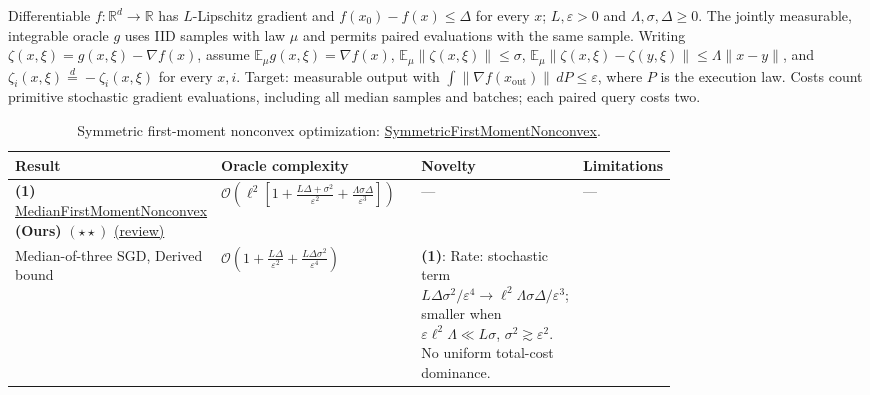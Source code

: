 \begin{table}[tp]
\centering
\caption{Symmetric first-moment nonconvex optimization: \href{https://github.com/k3nfalt/longtails/blob/main/LongTails/Setups/SymmetricFirstMomentNonconvex.lean}{Symmetric\allowbreak{}First\allowbreak{}Moment\allowbreak{}Nonconvex}.}\label{tab:SymmetricFirstMomentNonconvex}
\parbox{\linewidth}{\footnotesize Differentiable $f:\mathbb{R}^d\to\mathbb{R}$ has $L$-Lipschitz gradient and $f(x_0)-f(x)\le\Delta$ for every $x$; $L,\varepsilon>0$ and $\Lambda,\sigma,\Delta\ge0$. The jointly measurable, integrable oracle $g$ uses IID samples with law $\mu$ and permits paired evaluations with the same sample. Writing $\zeta(x,\xi)=g(x,\xi)-\nabla f(x)$, assume $\mathbb{E}_{\mu}g(x,\xi)=\nabla f(x)$, $\mathbb{E}_{\mu}\|\zeta(x,\xi)\|\le\sigma$, $\mathbb{E}_{\mu}\|\zeta(x,\xi)-\zeta(y,\xi)\|\le\Lambda\|x-y\|$, and $\zeta_i(x,\xi)\overset{d}{=}-\zeta_i(x,\xi)$ for every $x,i$. Target: measurable output with $\int\|\nabla f(x_{\mathrm{out}})\|\,dP\le\varepsilon$, where $P$ is the execution law. Costs count primitive stochastic gradient evaluations, including all median samples and batches; each paired query costs two.}\par\smallskip
\begin{threeparttable}
\footnotesize
\setlength{\tabcolsep}{4pt}\renewcommand{\arraystretch}{1.25}
\begin{tabularx}{\linewidth}{@{}>{\raggedright\arraybackslash}p{0.20\linewidth}>{\raggedright\arraybackslash}p{0.32\linewidth}>{\raggedright\arraybackslash}p{0.25\linewidth}>{\raggedright\arraybackslash}X@{}}
\toprule
\textbf{Result} & \textbf{Oracle complexity} & \textbf{Novelty} & \textbf{Limitations} \\
\midrule
\textbf{(1)} \href{https://github.com/k3nfalt/longtails/blob/main/LongTails/Theorems/MedianFirstMomentNonconvex.lean}{Median\allowbreak{}First\allowbreak{}Moment\allowbreak{}Nonconvex} \textbf{(Ours)} $(\star\star)$ \href{https://github.com/k3nfalt/longtails/blob/main/scripts/reviews/MedianFirstMomentNonconvex.md}{(review)}
& $\mathcal{O}\!\left(\ell^2\left[1+\frac{L\Delta+\sigma^2}{\varepsilon^2}+\frac{\Lambda\sigma\Delta}{\varepsilon^3}\right]\right)$
& --- & --- \\
\midrule[1.2pt]
Median-of-three SGD, Derived bound \citep[Cor.~2.2]{mshGhadimiLan2013v1}
& $\mathcal{O}\!\left(1+\frac{L\Delta}{\varepsilon^2}+\frac{L\Delta\sigma^2}{\varepsilon^4}\right)$
& \textbf{(1)}: Rate: stochastic term $L\Delta\sigma^2/\varepsilon^4\to\ell^2\Lambda\sigma\Delta/\varepsilon^3$; smaller when $\varepsilon\ell^2\Lambda\ll L\sigma$, $\sigma^2\gtrsim\varepsilon^2$. No uniform total-cost dominance.

\end{tabularx}
\end{threeparttable}
\end{table}
